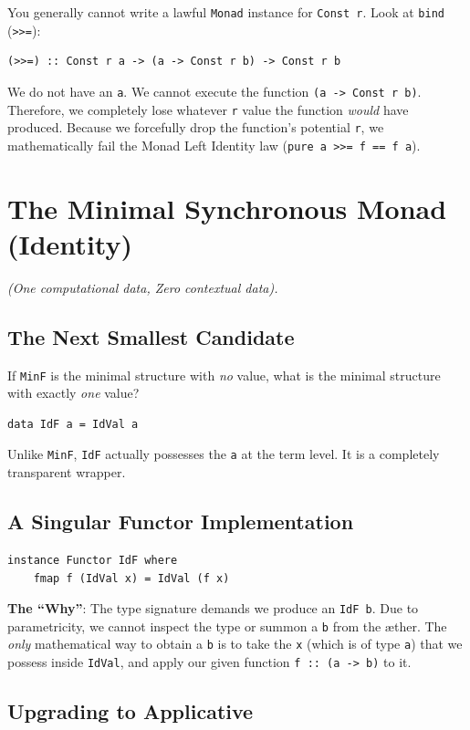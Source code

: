 \documentclass[12pt,a4paper]{article}
\begin{document}
You generally cannot write a lawful \texttt{Monad} instance for \texttt{Const r}. Look at \texttt{bind} (\texttt{>>=}):
\begin{lstlisting}
(>>=) :: Const r a -> (a -> Const r b) -> Const r b
\end{lstlisting}
We do not have an \texttt{a}. We cannot execute the function \texttt{(a -> Const r b)}. Therefore, we completely lose whatever \texttt{r} value the function \textit{would} have produced. Because we forcefully drop the function's potential \texttt{r}, we mathematically fail the Monad Left Identity law (\texttt{pure a >>= f == f a}).

\section{The Minimal Synchronous Monad (Identity)}

\textit{(One computational data, Zero contextual data).}

\subsection{The Next Smallest Candidate}

If \texttt{MinF} is the minimal structure with \textit{no} value, what is the minimal structure with exactly \textit{one} value?
\begin{lstlisting}
data IdF a = IdVal a
\end{lstlisting}
Unlike \texttt{MinF}, \texttt{IdF} actually possesses the \texttt{a} at the term level. It is a completely transparent wrapper.

\subsection{A Singular Functor Implementation}

\begin{lstlisting}
instance Functor IdF where
    fmap f (IdVal x) = IdVal (f x)
\end{lstlisting}

\textbf{The ``Why''}: The type signature demands we produce an \texttt{IdF b}. Due to parametricity, we cannot inspect the type or summon a \texttt{b} from the \ae{}ther. The \textit{only} mathematical way to obtain a \texttt{b} is to take the \texttt{x} (which is of type \texttt{a}) that we possess inside \texttt{IdVal}, and apply our given function \texttt{f :: (a -> b)} to it.

\subsection{Upgrading to Applicative}
\end{document}
